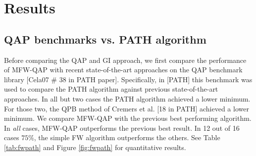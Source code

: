 % 
% 
% 

\section{Results}

\subsection{QAP benchmarks vs. PATH algorithm}

Before comparing the QAP and GI approach, we first compare the performance of MFW-QAP with recent state-of-the-art approaches on the QAP benchmark library [Cela07 \# 38 in PATH paper].  Specifically, in [PATH] this benchmark was used to compare the PATH algorithm against previous state-of-the-art approaches.  In all but two cases the PATH algorithm achieved a lower minimum.  For those two, the QPB method of Cremers et al. [18 in PATH] achieved a lower minimum.  We compare MFW-QAP with the previous best performing algorithm.  In \emph{all} cases, MFW-QAP outperforms the previous best result.  In 12 out of 16 cases $75\%$, the simple FW algorithm outperforms the others.  See Table \ref{tab:fwpath} and Figure \ref{fig:fwpath} for quantitative results.


